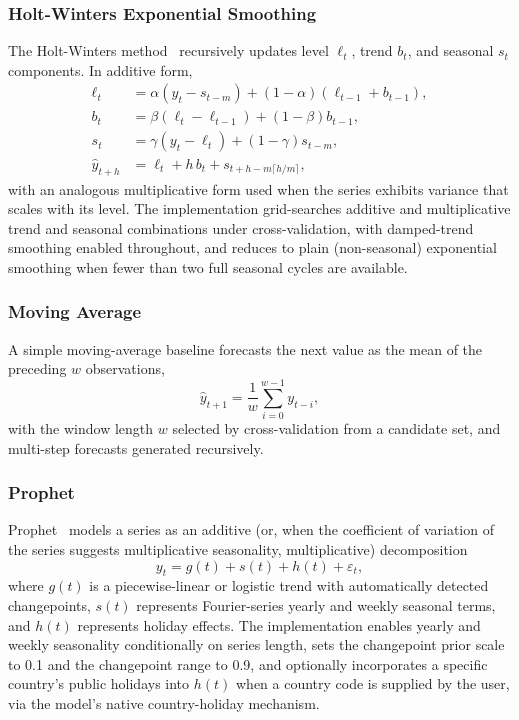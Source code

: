 \subsubsection{Holt-Winters Exponential Smoothing}
The Holt-Winters method~\cite{winters1960holtwinters} recursively updates level $\ell_t$, trend $b_t$, and seasonal $s_t$ components. In additive form,
\begin{align}
\ell_t &= \alpha (y_t - s_{t-m}) + (1-\alpha)(\ell_{t-1} + b_{t-1}), \label{eq:hw-level}\\
b_t &= \beta (\ell_t - \ell_{t-1}) + (1-\beta) b_{t-1}, \label{eq:hw-trend}\\
s_t &= \gamma (y_t - \ell_t) + (1-\gamma) s_{t-m}, \label{eq:hw-season}\\
\hat{y}_{t+h} &= \ell_t + h\,b_t + s_{t+h-m\lceil h/m\rceil}, \label{eq:hw-forecast}
\end{align}
with an analogous multiplicative form used when the series exhibits variance that scales with its level. The implementation grid-searches additive and multiplicative trend and seasonal combinations under cross-validation, with damped-trend smoothing enabled throughout, and reduces to plain (non-seasonal) exponential smoothing when fewer than two full seasonal cycles are available.

\subsubsection{Moving Average}
A simple moving-average baseline forecasts the next value as the mean of the preceding $w$ observations,
\begin{equation}
\hat{y}_{t+1} = \frac{1}{w}\sum_{i=0}^{w-1} y_{t-i},
\end{equation}
with the window length $w$ selected by cross-validation from a candidate set, and multi-step forecasts generated recursively.

\subsubsection{Prophet}
Prophet~\cite{taylor2018prophet} models a series as an additive (or, when the coefficient of variation of the series suggests multiplicative seasonality, multiplicative) decomposition
\begin{equation}
\label{eq:prophet}
y_t = g(t) + s(t) + h(t) + \varepsilon_t,
\end{equation}
where $g(t)$ is a piecewise-linear or logistic trend with automatically detected changepoints, $s(t)$ represents Fourier-series yearly and weekly seasonal terms, and $h(t)$ represents holiday effects. The implementation enables yearly and weekly seasonality conditionally on series length, sets the changepoint prior scale to 0.1 and the changepoint range to 0.9, and optionally incorporates a specific country's public holidays into $h(t)$ when a country code is supplied by the user, via the model's native country-holiday mechanism.

